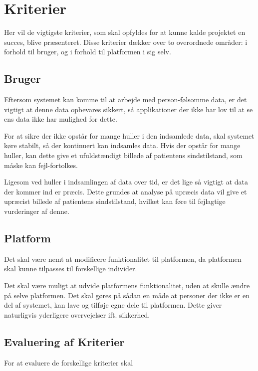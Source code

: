 \section{Kriterier}
Her vil de vigtigste kriterier, som skal opfyldes for at kunne kalde projektet en succes, blive præsenteret.
Disse kriterier dækker over to overordnede områder: i forhold til bruger, og i forhold til platformen i sig selv.

\subsection{Bruger}
\begin{description}[style=nextline]
	\item[Sikkerhed] 
		Eftersom systemet kan komme til at arbejde med person-følsomme data, er det vigtigt at denne data opbevares sikkert, så applikationer der ikke har lov til at se ens data ikke har mulighed for dette.
	\item[Stabilitet]
		For at sikre der ikke opstår for mange huller i den indsamlede data, skal systemet køre stabilt, så der kontinuert kan indsamles data.
	Hvis der opstår for mange huller, kan dette give et ufuldstændigt billede af patientens sindstilstand, som måske kan fejl-fortolkes.
	\item[Præcision]
		Ligesom ved huller i indsamlingen af data over tid, er det lige så vigtigt at data der kommer ind er præcis.
	Dette grundes at analyse på upræcis data vil give et upræcist billede af patientens sindstilstand, hvilket kan føre til fejlagtige vurderinger af denne.	
\end{description}

\subsection{Platform}
\begin{description}[style=nextline]
	\item[Fleksibilitet]
	Det skal være nemt at modificere funktionalitet til platformen, da platformen skal kunne tilpasses til forskellige individer.
	\item[Mulighed for Udvidelse]
	Det skal være muligt at udvide platformens funktionalitet, uden at skulle ændre på selve platformen.
	Det skal gøres på sådan en måde at personer der ikke er en del af systemet, kan lave og tilføje egne dele til platformen.
	Dette giver naturligvis yderligere overvejelser ift. sikkerhed.
\end{description}

\subsection{Evaluering af Kriterier}
For at evaluere de forskellige kriterier skal


